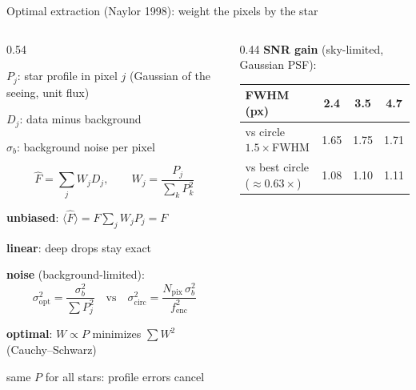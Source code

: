 \begin{frame}{Optimal extraction (Naylor 1998): weight the pixels by the star}
  \tightdisplays
  \begin{columns}[T]
  \begin{column}{0.54\textwidth}
    \scriptsize
    \begin{tightlist}
      \item $P_j$: star profile in pixel $j$ (Gaussian of the seeing, unit flux)
      \item $D_j$: data minus background
      \item $\sigma_b$: background noise per pixel
    \end{tightlist}
    \begin{tcolorbox}[colback=syzblue!6, colframe=syzblue!40, boxrule=0.4pt, arc=2pt, left=3pt, right=3pt, top=0pt, bottom=0pt]
    \[ \hat F = \sum_j W_j D_j,\qquad W_j = \frac{P_j}{\sum_k P_k^2} \]
    \end{tcolorbox}
    \begin{tightlist}
      \item \textbf{unbiased}: $\langle \hat F\rangle = F \sum_j W_j P_j = F$
      \item \textbf{linear}: deep drops stay exact
      \item \textbf{noise} (background-limited):
        \[ \sigma^2_\mathrm{opt} = \frac{\sigma_b^2}{\sum P_j^2} \quad\text{vs}\quad
           \sigma^2_\mathrm{circ} = \frac{N_\mathrm{pix}\,\sigma_b^2}{f_\mathrm{enc}^2} \]
      \item \textbf{optimal}: $W \propto P$ minimizes $\sum W^2$ (Cauchy--Schwarz)
      \item same $P$ for all stars: profile errors cancel
    \end{tightlist}
  \end{column}
  \begin{column}{0.44\textwidth}
    \footnotesize
    \textbf{SNR gain} (sky-limited, Gaussian PSF):\\[0.4ex]
    \centering
    \begin{tabular}{@{}lccc@{}}
      \toprule
      FWHM (px) & 2.4 & 3.5 & 4.7 \\
      \midrule
      vs circle $1.5\times$FWHM & 1.65 & 1.75 & 1.71 \\
      vs best circle ($\approx 0.63\times$) & 1.08 & 1.10 & 1.11 \\
      \bottomrule
    \end{tabular}\\[0.3ex]

\end{column}
\end{columns}
\end{frame}

